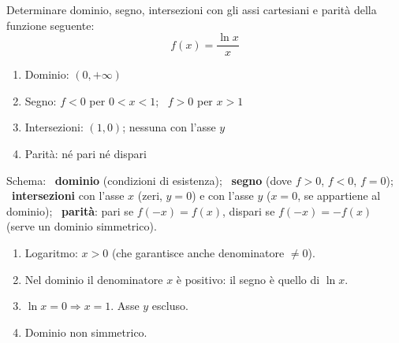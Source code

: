 \begin{question}[ID=1.12, subtitle={Studio di una funzione logaritmica con denominatore}, difficulty=media, tags={funzioni, studio di funzione, logaritmi}]
Determinare dominio, segno, intersezioni con gli assi cartesiani e parità della funzione seguente:
\begin{equation*}
    f(x)=\frac{\ln x}{x}
\end{equation*}
\begin{solution}
\begin{enumerate}
    \item Dominio: $(0,+\infty)$
    \item Segno: $f<0$ per $0<x<1$; \ $f>0$ per $x>1$
    \item Intersezioni: $(1,0)$; nessuna con l'asse $y$
    \item Parità: né pari né dispari
\end{enumerate}
\end{solution}
\begin{explanation}
Schema: \ \textbf{dominio} (condizioni di esistenza); \ \textbf{segno} (dove $f>0$, $f<0$, $f=0$); \ \textbf{intersezioni} con l'asse $x$ (zeri, $y=0$) e con l'asse $y$ ($x=0$, se appartiene al dominio); \ \textbf{parità}: pari se $f(-x)=f(x)$, dispari se $f(-x)=-f(x)$ (serve un dominio simmetrico).
\begin{enumerate}
    \item Logaritmo: $x>0$ (che garantisce anche denominatore $\neq0$).
    \item Nel dominio il denominatore $x$ è positivo: il segno è quello di $\ln x$.
    \item $\ln x=0 \Rightarrow x=1$. Asse $y$ escluso.
    \item Dominio non simmetrico.
\end{enumerate}
\end{explanation}
\end{question}


